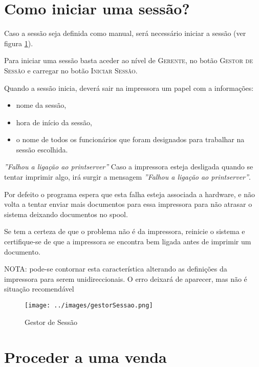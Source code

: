 \documentclass[a4paper,11pt,openany]{memoir}
\begin{document}
\section{Como iniciar uma sessão?}
Caso a sessão seja definida como manual, será necessário iniciar a sessão (ver figura \ref{gestorSessao}). 

Para iniciar uma sessão basta aceder ao nível de \textsc{Gerente}, no botão \textsc{Gestor de Sessão} 
e carregar no botão \textsc{Iniciar Sessão}.


Quando a sessão inicia, deverá sair na impressora um papel com a informações:
\begin{itemize}
	\item nome da sessão,
	\item hora de início da sessão, 
	\item o nome de todos os funcionários que foram designados para trabalhar na sessão escolhida.
\end{itemize}

\begin{bclogo}[couleur=red!30,arrondi=0.1,logo=\bctakecare,ombre=true]{\emph{''Falhou a ligação ao printserver''}} 
Caso a impressora esteja desligada quando se tentar imprimir algo, irá surgir a mensagem \emph{''Falhou a ligação ao printserver''}.

Por defeito o programa espera que esta falha esteja associada a hardware, e não volta a tentar enviar mais documentos para essa impressora 
para não atrasar o sistema deixando documentos no spool.

Se tem a certeza de que o problema não é da impressora, reinicie o sistema e certifique-se de que a impressora se encontra bem ligada antes 
de imprimir um documento.

\vspace{5mm}
NOTA: pode-se contornar esta característica alterando as definições da impressora para serem unidireccionais.
O erro deixará de aparecer, mas não é situação recomendável
\end{bclogo}



\begin{figure}
\begin{center}
\texttt{[image: ../images/gestorSessao.png]}
\caption[Submanifold]{Gestor de Sessão}
\label{gestorSessao}
\end{center}
\end{figure}




\section{Proceder a uma venda}
\end{document}
